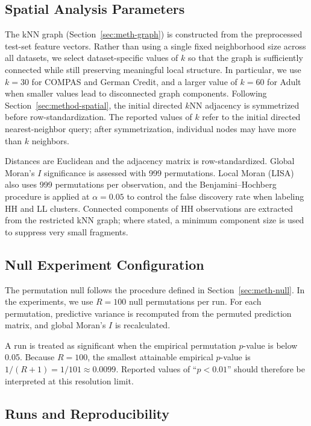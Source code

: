 \subsection{Spatial Analysis Parameters}
\label{sec:exp-knn-graph}

The kNN graph (Section~\ref{sec:meth-graph}) is constructed from the preprocessed
test-set feature vectors. Rather than using a single fixed neighborhood size across all
datasets, we select dataset-specific values of $k$ so that the graph is sufficiently connected
while still preserving meaningful local structure. In particular, we use $k = 30$ for
COMPAS and German Credit, and a larger value of $k = 60$ for Adult when smaller
values lead to disconnected graph components.
Following Section~\ref{sec:method-spatial}, the initial directed $k$NN adjacency is symmetrized before row-standardization. The reported values of $k$ refer to the initial directed nearest-neighbor query; after symmetrization, individual nodes may have more than $k$ neighbors.

Distances are Euclidean and the adjacency matrix is row-standardized. Global Moran's $I$
significance is assessed with 999 permutations. Local Moran (LISA) also uses 999
permutations per observation, and the Benjamini--Hochberg procedure is applied at
$\alpha = 0.05$ to control the false discovery rate when labeling HH and LL clusters.
Connected components of HH observations are extracted from the restricted kNN graph;
where stated, a minimum component size is used to suppress very small fragments.

\subsection{Null Experiment Configuration}
\label{sec:exp-null}

The permutation null follows the procedure defined in Section~\ref{sec:meth-null}. In
the experiments, we use $R = 100$ null permutations per run. For each permutation, predictive variance is recomputed from the permuted prediction
matrix, and global Moran's $I$ is recalculated.

A run is treated as significant when the empirical permutation $p$-value is below 0.05.
Because $R=100$, the smallest attainable empirical $p$-value is $1/(R+1)=1/101
\approx 0.0099$. Reported values of ``$p<0.01$'' should therefore be interpreted at this
resolution limit.

\subsection{Runs and Reproducibility}

